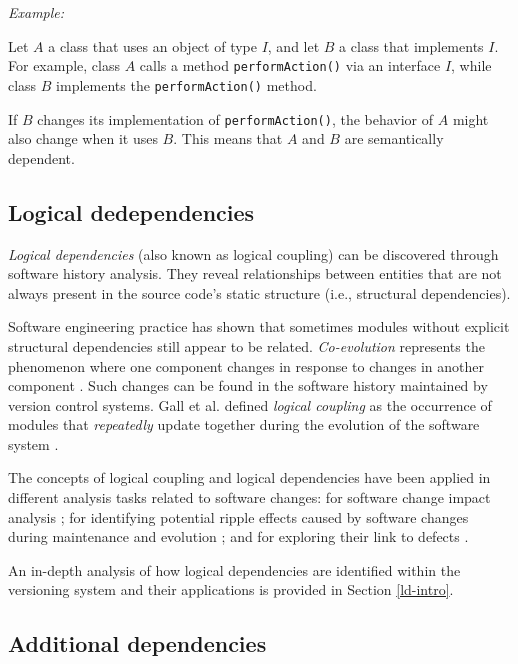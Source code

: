 \textit{Example:}

Let \(A\) a class that uses an object of type \(I\), and let \(B\) a class that implements \(I\). For example, class \(A\) calls a method \texttt{performAction()} via an interface \(I\), while class \(B\) implements the \texttt{performAction()} method.

If \(B\) changes its implementation of \texttt{performAction()}, the behavior of \(A\) might also change when it uses \(B\). This means that \(A\) and \(B\) are semantically dependent.



\subsection{Logical dedependencies}
\hspace{4em} \textit{Logical dependencies} (also known as logical coupling) can be discovered through software history analysis. They reveal relationships between entities that are not always present in the source code's static structure (i.e., structural dependencies).

Software engineering practice has shown that sometimes modules without explicit structural dependencies still appear to be related. \textit{Co-evolution} represents the phenomenon where one component changes in response to changes in another component \cite{Yu:2007:UCC:1231330.1231370, 5166450}. Such changes can be found in the software history maintained by version control systems. Gall et al. defined \textit{logical coupling} as the occurrence of modules that \emph{repeatedly} update together during the evolution of the software system \cite{Gall:1998:DLC:850947.853338, Gall:2003:CRH:942803.943741, 6606615}.

The concepts of logical coupling and logical dependencies have been applied in different analysis tasks related to software changes: for software change impact analysis \cite{1553643}; for identifying potential ripple effects caused by software changes during maintenance and evolution \cite{DBLP:conf/issre/OlivaG15, Oliva:2011:ISL:2067853.2068086, Poshyvanyk2009, posh2010}; and for exploring their link to defects \cite{wiese, Zimmermann:2004:MVH:998675.999460}.

An in-depth analysis of how logical dependencies are identified within the versioning system and their applications is provided in Section \ref{ld-intro}.



\subsection{Additional dependencies}

